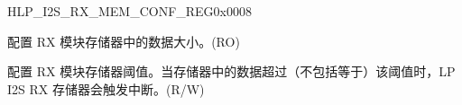 \begin{register}{H}{LP\_I2S\_RX\_MEM\_CONF\_REG}{0x0008}\label{regdesc:LPI2SRXMEMCONFREG}
%
%
%
\regnewline%
\begin{regdesc}\begin{reglist}
\label{fielddesc:LPI2SRXMEMFIFOCNT}\item[LP\_I2S\_RX\_MEM\_FIFO\_CNT] 配置 RX 模块存储器中的数据大小。(RO)
\label{fielddesc:LPI2SRXMEMTHRESHOLD}\item[LP\_I2S\_RX\_MEM\_THRESHOLD] 配置 RX 模块存储器阈值。当存储器中的数据超过（不包括等于）该阈值时，LP I2S RX 存储器会触发中断。(R/W)
\end{reglist}\end{regdesc}
\end{register}


